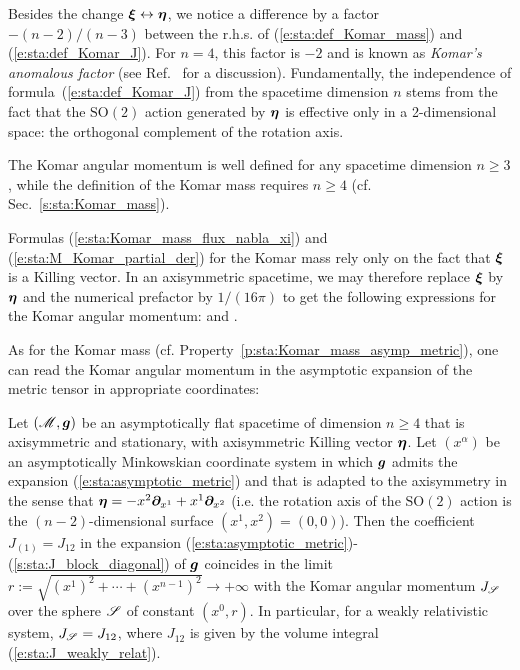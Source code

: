 \begin{remark}
Besides the change $\bm{\xi}\leftrightarrow\bm{\eta}$, we notice a difference by a factor $-(n-2)/(n-3)$ between the r.h.s. of (\ref{e:sta:def_Komar_mass}) and (\ref{e:sta:def_Komar_J}). For $n=4$, this factor is $-2$ and is
known as \emph{Komar's anomalous factor} (see Ref.~\cite{Katz85} for a discussion).
Fundamentally, the independence of formula~(\ref{e:sta:def_Komar_J}) from the spacetime dimension $n$
stems from the fact that the $\mathrm{SO}(2)$ action generated by $\bm{\eta}$
is effective only in a 2-dimensional space: the orthogonal complement of the rotation axis.
\end{remark}

\begin{remark}
The Komar angular momentum is well defined for any spacetime dimension $n\geq 3$, while the definition of the Komar mass requires
$n\geq 4$ (cf. Sec.~\ref{s:sta:Komar_mass}).
\end{remark}


Formulas (\ref{e:sta:Komar_mass_flux_nabla_xi}) and (\ref{e:sta:M_Komar_partial_der})
for the Komar mass rely only on the fact that $\bm{\xi}$ is a Killing vector.
In an axisymmetric spacetime, we may therefore replace $\bm{\xi}$ by $\bm{\eta}$
and the numerical prefactor by $1/(16\pi)$ to get the following expressions
for the Komar angular momentum:
\be \label{e:sta:J_Komar_cov_der}
\ee
and
\be \label{e:sta:J_Komar_partial_der}
     .
\ee

As for the Komar mass (cf. Property~\ref{p:sta:Komar_mass_asymp_metric}), one can read the
Komar angular momentum in the asymptotic expansion of the metric tensor in appropriate coordinates:

\begin{prop}
Let $(\mathscr{M},\bm{g})$ be an asymptotically flat spacetime of dimension $n\geq 4$ that is axisymmetric
and stationary, with axisymmetric Killing vector $\bm{\eta}$.
Let $(x^\alpha)$ be an asymptotically Minkowskian coordinate system
in which $\bm{g}$ admits the expansion (\ref{e:sta:asymptotic_metric})
and that is adapted to the axisymmetry in the sense
that $\bm{\eta} = - x^2 \bm{\partial}_{x^1} + x^1 \bm{\partial}_{x^2}$
(i.e. the rotation axis of the $\mathrm{SO}(2)$ action
is the $(n-2)$-dimensional surface $(x^1,x^2) = (0,0)$).
Then the coefficient $J_{(1)} = J_{12}$ in the expansion
(\ref{e:sta:asymptotic_metric})-(\ref{s:sta:J_block_diagonal}) of $\bm{g}$
coincides in the limit $r := \sqrt{(x^1)^2 + \cdots + (x^{n-1})^2} \to +\infty$ with
the Komar angular momentum $J_{\mathscr{S}}$ over the sphere $\mathscr{S}$
of constant $(x^0,r)$.
In particular, for a weakly relativistic system, $J_{\mathscr{S}} = J_{12}$,
where $J_{12}$ is given by the volume integral (\ref{e:sta:J_weakly_relat}).
\end{prop}


